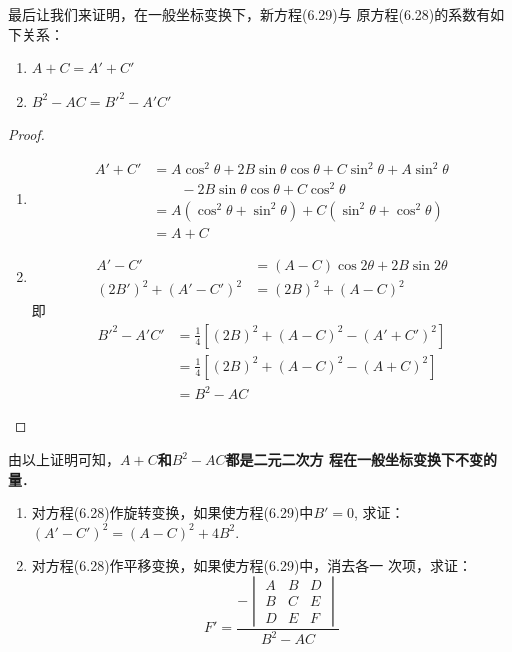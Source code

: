 最后让我们来证明，在一般坐标变换下，新方程(6.29)与
原方程(6.28)的系数有如下关系：
\begin{enumerate}
    \item $A+C=A'+C'$
    \item $B^2-AC={B'}^2-A'C'$
\end{enumerate}

\begin{proof}
\begin{enumerate}
    \item \[\begin{split}
 A'+C'&=A\cos^2\theta +2B\sin\theta \cos\theta 
    +C \sin^2\theta +A\sin^2\theta
    \\
    &\qquad -2B\sin\theta \cos\theta +C\cos^2\theta\\
    &=A(\cos^2\theta+\sin^2\theta)+C(\sin^2\theta+\cos^2\theta)\\
    &=A+C       
    \end{split}\]
    \item \[\begin{split}
A'-C'&=(A-C)\cos2\theta+2B\sin2\theta \\
(2B')^2+(A'-C')^2&=(2B)^2+(A-C)^2        
    \end{split}\]
    即
\[\begin{split}
    {B'}^2-A'C'&=\frac{1}{4}\left[(2B)^2+(A-C)^2-(A'+C')^2\right]\\
    &=\frac{1}{4}\left[(2B)^2+(A-C)^2-(A+C)^2\right]\\
    &=B^2-AC
\end{split}\]
\end{enumerate}
\end{proof}

由以上证明可知，\textbf{$A+C$和$B^2-AC$都是二元二次方
程在一般坐标变换下不变的量}．

\begin{ex}
\begin{enumerate}
    \item 对方程(6.28)作旋转变换，如果使方程(6.29)中$B'=0$, 
    求证：$(A'-C')^2=(A-C)^2+4B^2$.
    \item 对方程(6.28)作平移变换，如果使方程(6.29)中，消去各一
    次项，求证：
\[F'=\frac{-\begin{vmatrix}
    A&B&D\\B&C&E\\D&E&F
\end{vmatrix}}{B^2-AC}\]
\end{enumerate}
\end{ex}


